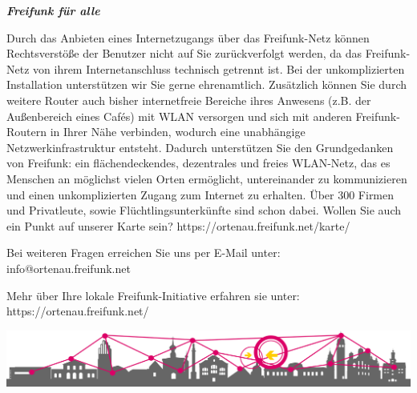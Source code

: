 \documentclass[a4paper]{article}
\begin{document}
\newpage

\thispagestyle{empty}

\begin{center}
  \Huge \textit{\textbf{\textcolor{freifunkpink}{Freifunk für alle}}} \\
  \vspace{0.6cm}
\end{center}

\begin{Row}[cellsep=0.75cm]
  \begin{Cell}{1}
      Durch das Anbieten eines Internetzugangs über das Freifunk-Netz können Rechtsverstöße der Benutzer nicht auf Sie zurückverfolgt werden, da das Freifunk-Netz von ihrem Internetanschluss technisch getrennt ist.
      Bei der unkomplizierten Installation unterstützen wir Sie gerne ehrenamtlich. Zusätzlich können Sie durch weitere Router auch bisher internetfreie Bereiche ihres Anwesens (z.B. der Außenbereich eines Cafés) mit WLAN versorgen und sich mit anderen Freifunk-Routern in Ihrer Nähe verbinden, wodurch eine unabhängige Netzwerkinfrastruktur entsteht. Dadurch unterstützen Sie den Grundgedanken von Freifunk: ein flächendeckendes, dezentrales und freies WLAN-Netz, das es Menschen an möglichst vielen Orten ermöglicht, untereinander zu kommunizieren und einen unkomplizierten Zugang zum Internet zu erhalten. Über 300 Firmen und Privatleute, sowie Flüchtlingsunterkünfte sind schon dabei.
      Wollen Sie auch ein Punkt auf unserer Karte sein? https://ortenau.freifunk.net/karte/

      \vspace{1cm}


      \begin{center}
        Bei weiteren Fragen erreichen Sie uns per E-Mail unter:\\
        info@ortenau.freifunk.net

        \vspace{1cm}
        Mehr über Ihre lokale Freifunk-Initiative erfahren sie unter:\\
        \vspace{0.5cm}
        \large https://ortenau.freifunk.net/
      \end{center}
      \vspace{2cm}


  \end{Cell}
\end{Row}

\vspace{0.8cm}
\begin{center}
  \hspace*{-0.05 \paperwidth}\includegraphics[width=\paperwidth]{../../images/footer_skyline_notext.png}
\end{center}
\end{document}
